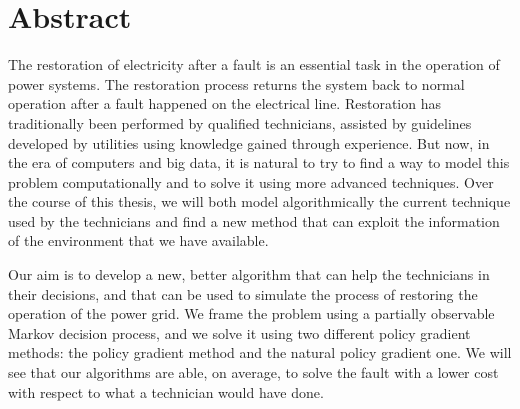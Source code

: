 \chapter*{Abstract}

The restoration of electricity after a fault is an essential task in the operation of power systems. The restoration process returns the system back to normal operation after a fault happened on the electrical line. Restoration has traditionally been performed by qualified technicians, assisted by guidelines developed by utilities using knowledge gained through experience. But now, in the era of computers and big data, it is natural to try to find a way to model this problem computationally and to solve it using more advanced techniques. Over the course of this thesis, we will both model algorithmically the current technique used by the technicians and find a new method that can exploit the information of the environment that we have available.

Our aim is to develop a new, better algorithm that can help the technicians in their decisions, and that can be used to simulate the process of restoring the operation of the power grid. We frame the problem using a partially observable Markov decision process, and we solve it using two different policy gradient methods: the policy gradient method and the natural policy gradient one. We will see that our algorithms are able, on average, to solve the fault with a lower cost with respect to what a technician would have done.